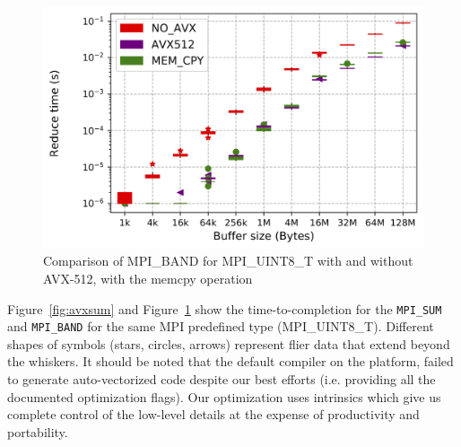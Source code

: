 \documentclass[5p,times,twocolumn]{elsarticle}
\newcommand{\mpifunc}[1]{\lstinline"MPI_#1"\xspace}
\begin{document}
\begin{figure}[h]
    \centering
    \includegraphics[width=\linewidth]{avx_extend_more_prod_u8_1k-128M.png}
    \caption{Comparison of MPI\_BAND for MPI\_UINT8\_T with and without AVX-512, with the memcpy operation}
    \label{fig:avxband}
\end{figure}

Figure~\ref{fig:avxsum} and Figure~\ref{fig:avxband} show the time-to-completion for the
\mpifunc{SUM} and \mpifunc{BAND} for the same MPI predefined type (MPI\_UINT8\_T). Different shapes of symbols (stars, circles,
arrows) represent flier data that extend beyond the whiskers.
It should be noted that the default compiler on the platform, failed to
generate auto-vectorized code despite our best efforts (i.e.
providing all the documented optimization flags). Our optimization uses intrinsics which give us complete
control of the low-level details at the expense of productivity and
portability.
\end{document}
